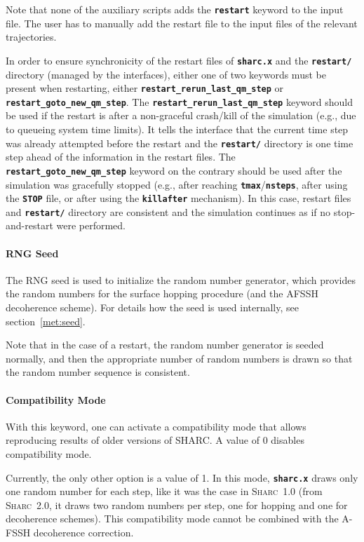 \documentclass[a4paper,10pt,DIV=15,openany]{scrbook}
\newcommand{\sharc}{\textsc{Sharc}}
\newcommand{\ttt}[1]{\textbf{\texttt{#1}}}
\begin{document}
Note that none of the auxiliary scripts adds the \ttt{restart} keyword to the input file. The user has to manually add the restart file to the input files of the relevant trajectories.

In order to ensure synchronicity of the restart files of \ttt{sharc.x} and the \ttt{restart/} directory (managed by the interfaces), either one of two keywords must be present when restarting, either \ttt{restart\_rerun\_last\_qm\_step} or \ttt{restart\_goto\_new\_qm\_step}.
The \ttt{restart\_rerun\_last\_qm\_step} keyword should be used if the restart is after a non-graceful crash/kill of the simulation (e.g., due to queueing system time limits). 
It tells the interface that the current time step was already attempted before the restart and the \ttt{restart/} directory is one time step ahead of the information in the restart files.
The \ttt{restart\_goto\_new\_qm\_step} keyword on the contrary should be used after the simulation was gracefully stopped (e.g., after reaching \ttt{tmax}/\ttt{nsteps}, after using the \ttt{STOP} file, or after using the \ttt{killafter} mechanism).
In this case, restart files and \ttt{restart/} directory are consistent and the simulation continues as if no stop-and-restart were performed.


\paragraph{RNG Seed}

The RNG seed is used to initialize the random number generator, which provides the random numbers for the surface hopping procedure (and the AFSSH decoherence scheme). For details how the seed is used internally, see section~\ref{met:seed}.

Note that in the case of a restart, the random number generator is seeded normally, and then the appropriate number of random numbers is drawn so that the random number sequence is consistent.

\paragraph{Compatibility Mode}

With this keyword, one can activate a compatibility mode that allows reproducing results of older versions of SHARC.
A value of 0 disables compatibility mode.

Currently, the only other option is a value of 1. 
In this mode, \ttt{sharc.x} draws only one random number for each step, like it was the case in \sharc\ 1.0 (from \sharc\ 2.0, it draws two random numbers per step, one for hopping and one for decoherence schemes).
This compatibility mode cannot be combined with the A-FSSH decoherence correction.
\end{document}
